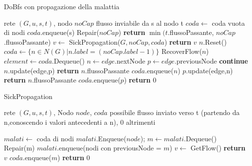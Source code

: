 \documentclass{article}
\begin{document}
\begin{algorithm}
\caption{DoBfs con propagazione della malattia}
\begin{algorithmic}
\REQUIRE rete $(G,u,s,t)$, nodo $noCap$
\ENSURE flusso inviabile da s al nodo t
\STATE $coda \leftarrow$ coda vuota di nodi
\STATE $coda$.enqueue(s)
\ELSE
\STATE Repair($noCap$) 
\STATE \textbf{return} $\min(t$.flussoPassante, $noCap$.flussoPassante) 
\ENDIF
\STATE $v \leftarrow$ SickPropagation($G,noCap,coda$)
\STATE \textbf{return} $v$
\ENDIF
{}
\STATE $n$.Reset()
\ENDFOR
{}
\STATE $coda \leftarrow  \{n \in N(G) | n.label = (noCap.label - 1)\}$
\ENDIF
{}
\STATE RecoverFlow($n$)
\ENDFOR
\ENDIF
{}
\STATE $element \leftarrow coda$.Dequeue()
\STATE $n \leftarrow  edge.$nextNode
\STATE $p \leftarrow edge.$previousNode
\STATE \textbf{continue}
\ENDIF
{}
\STATE $n$.update(edge,p) 
\STATE \textbf{return} $n$.flussoPassante
\ELSE
\STATE $coda$.enqueue($n$)
\ENDIF
{}
\STATE $p$.update(edge,n)
\STATE \textbf{return} $n$.flussoPassante
\ELSE
\STATE $coda.$enqueue($p$)
\ENDIF
\ENDIF
\ENDFOR
\ENDWHILE
\STATE \textbf{return} 0

\end{algorithmic}
\end{algorithm}
\begin{algorithm}
\caption{SickPropagation}
\begin{algorithmic}
\REQUIRE rete $(G,u,s,t)$, Nodo $node$, $coda$
\ENSURE possibile flusso inviato verso t (partendo da n,conoscendo i valori antecedenti a n), 0 altrimenti

\STATE $malati \leftarrow$ coda di nodi
\STATE $malati$.Enqueue($node$);
\STATE $m \leftarrow malati.$Dequeue()
\STATE Repair(m)
\STATE $malati$.enqueue(nodi con previousNode = $m$)
\STATE $v \leftarrow$ GetFlow()
\STATE \textbf{return} $v$
\ELSE
\STATE $coda$.enqueue($m$)
\ENDIF
\ENDWHILE
\STATE \textbf{return} 0
\end{algorithmic}
\end{algorithm}
\end{document}
